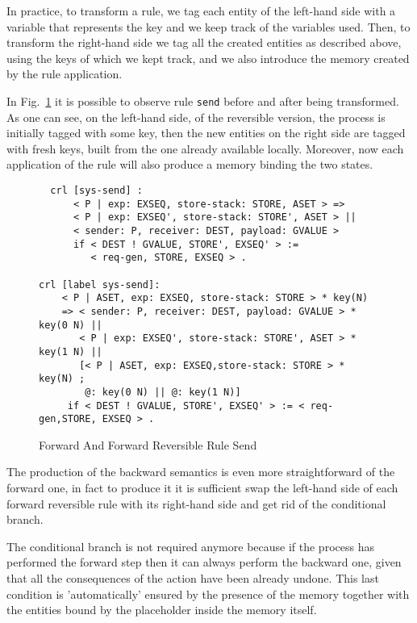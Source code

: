 \documentclass{article}[12pt,a4paper]
\theoremstyle{definition}
\begin{document}
In practice, to transform a rule, we tag each entity of the left-hand
side with a variable that represents the key and we keep track of the variables
used. Then, to transform the right-hand side we tag all the created entities as
described above, using the keys of which we kept track, and we also introduce the memory created by the rule application.

In Fig.~\ref{fig:revsend} it is possible to observe rule \verb_send_ before and after being
transformed. As one can see, on the left-hand side, of the reversible version, the process is initially
tagged with some key, then the new entities on the right side are tagged with
fresh keys, built from the one already available locally. Moreover, now each
application of the rule will also produce a memory binding the two states.

\begin{figure}[t]
  \centering
\begin{verbatim}
  crl [sys-send] :
      < P | exp: EXSEQ, store-stack: STORE, ASET > =>
      < P | exp: EXSEQ', store-stack: STORE', ASET > ||
      < sender: P, receiver: DEST, payload: GVALUE >
      if < DEST ! GVALUE, STORE', EXSEQ' > :=
         < req-gen, STORE, EXSEQ > .

crl [label sys-send]:
    < P | ASET, exp: EXSEQ, store-stack: STORE > * key(N)
    => < sender: P, receiver: DEST, payload: GVALUE > * key(0 N) || 
       < P | exp: EXSEQ', store-stack: STORE', ASET > * key(1 N) || 
       [< P | ASET, exp: EXSEQ,store-stack: STORE > * key(N) ;
        @: key(0 N) || @: key(1 N)]
     if < DEST ! GVALUE, STORE', EXSEQ' > := < req-gen,STORE, EXSEQ > .
\end{verbatim}
  \caption{Forward And Forward Reversible Rule Send}
  \label{fig:revsend}
\end{figure}


The production of the backward semantics is even more straightforward of the
forward one, in fact to produce it it is sufficient swap the left-hand side of
each forward reversible rule with its right-hand side and get rid of the
conditional branch.

The conditional branch is not required anymore because if the process has
performed the forward step then it can always perform the backward one, given
that all the consequences of the action have been already undone. This last
condition is 'automatically' ensured by the presence of the memory together with
the entities bound by the placeholder inside the memory itself.
\end{document}
